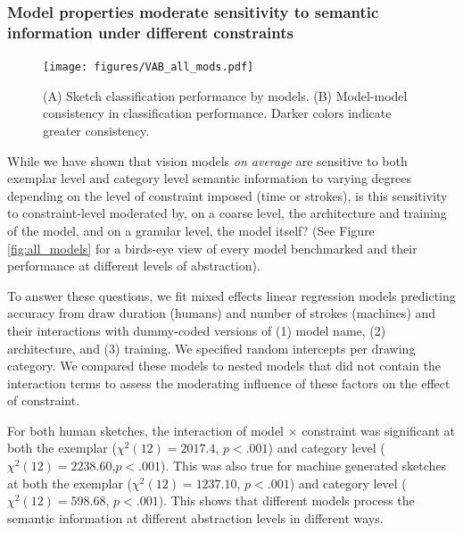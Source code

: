 \documentclass[10pt,letterpaper]{article}
\begin{document}
\subsubsection{Model properties moderate sensitivity to semantic information under different constraints}
\begin{figure}
    \centering
    \texttt{[image: figures/VAB\_all\_mods.pdf]}
    \vspace{-0.5em}
    \caption{(A) Sketch classification performance by models. (B) Model-model consistency in classification performance. Darker colors indicate greater consistency.}
    \label{fig:all_mods}
    \vspace{-1.5em}
\end{figure}

While we have shown that vision models \textit{on average} are sensitive to both exemplar level and category level semantic information to varying degrees depending on the level of constraint imposed (time or strokes), is this sensitivity to constraint-level moderated by, on a coarse level, the architecture and training of the model, and on a granular level, the model itself? (See Figure \ref{fig:all_models} for a birds-eye view of every model benchmarked and their performance at different levels of abstraction).

To answer these questions, we fit mixed effects linear regression models predicting accuracy from draw duration (humans) and number of strokes (machines) and their interactions with dummy-coded versions of (1) model name, (2) architecture, and (3) training. 
We specified random intercepts per drawing category.
We compared these models to nested models that did not contain the interaction terms to assess the moderating influence of these factors on the effect of constraint.

For both human sketches, the interaction of model $\times$ constraint was significant at both the exemplar ($\chi^2(12) = 2017.4$, $p <.001$) and category level ($\chi^2(12) = 2238.60$,$p <.001$).
This was also true for machine generated sketches at both the exemplar ($\chi^2(12) = 1237.10$, $p < .001$) and category level ($\chi^2(12) = 598.68$, $ p <. 001$). 
This shows that different models process the semantic information at different abstraction levels in different ways.
\end{document}
